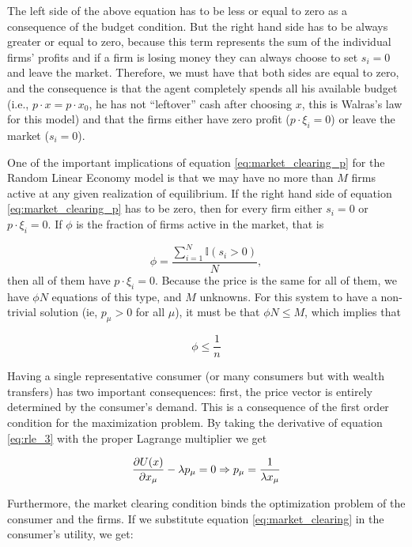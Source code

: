 The left side of the above equation has to be less or equal
to zero as a consequence of the budget condition. But the right hand side has
to be always greater or equal to zero, because this term represents
the sum of the individual firms' profits and if a firm is losing money
they can always choose to set $s_i = 0$ and leave the
market. Therefore, we must have that both sides are equal to zero, and
the consequence is that the agent completely spends all his available
budget (i.e., $p\cdot x = p \cdot x_0$, he has not ``leftover'' cash
after choosing $x$, this is Walras's law for this model) and that the firms either have zero profit
($p\cdot \xi_i = 0$) or leave the market ($s_i = 0$).

One of the important implications of equation
\eqref{eq:market_clearing_p} for the Random Linear Economy model is
that we may have no more than $M$ firms active at any given
realization of equilibrium. If the right hand side of equation
\eqref{eq:market_clearing_p} has to be zero, then for every firm
either $s_i = 0$ or $p\cdot \xi_i = 0$. If $\phi$ is the fraction of
firms active in the market, that is

\begin{equation}
  \label{eq:phi_def}
  \phi = \frac{\sum_{i=1}^N \mathds{I}(s_i > 0)}{N},
\end{equation}
then all of them have $p\cdot \xi_i = 0$. Because the price is the
same for all of them, we have $\phi N$ equations of this type, and $M$
unknowns. For this system to have a non-trivial solution (ie,
$p_\mu > 0$ for all $\mu$), it must be that $\phi N \leq M$, which
implies that

\begin{equation}
  \label{eq:phi_max}
  \phi \leq \frac{1}{n}
\end{equation}

Having a single representative consumer (or
many consumers but with wealth transfers) has two important
consequences: first, the price vector is entirely determined by the
consumer's demand. This is a consequence of the first order condition for
the maximization problem. By taking the derivative of equation
\eqref{eq:rle_3} with the proper Lagrange multiplier we get

\begin{equation}
  \label{eq:rle_8}
  \frac{\partial U(x)}{\partial x_\mu} - \lambda p_\mu = 0 \Rightarrow p_\mu =
  \frac{1}{\lambda x_\mu}
\end{equation}

Furthermore, the market clearing condition binds the optimization
problem of the consumer and the firms. If we substitute equation
\eqref{eq:market_clearing} in the consumer's utility, we get:

